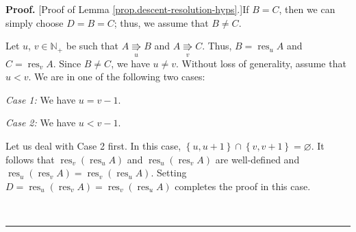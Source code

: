 \documentclass[12pt]{article}
\theoremstyle{plain}
\theoremstyle{definition}
\newenvironment{proof}[1][Proof]{\noindent\textbf{#1.} }{\ \rule{0.5em}{0.5em}}
\begin{document}
\begin{proof}
[Proof of Lemma \ref{prop.descent-resolution-hyps}.]If $B=C$, then we can
simply choose $D=B=C$; thus, we assume that $B\neq C$.

Let $u$, $v \in\mathbb{N}_{+}$ be such that $A\underset{u}{\Rrightarrow}B$ and $A\underset{v}{\Rrightarrow}C$.
Thus, $B = \operatorname{res}_u A$ and $C = \operatorname{res}_v A$.
Since $B \neq C$, we have $u \neq v$.
Without loss of generality, assume that $u<v$. We are in one of the following two cases:

\textit{Case 1:} We have $u=v-1$.

\textit{Case 2:} We have $u<v-1$.

Let us deal with Case 2 first. In this
case, $\left\{  u,u+1\right\}  \cap\left\{  v,v+1\right\}
=\varnothing$.
It follows that
$\operatorname*{res}\nolimits_{v}\left(  \operatorname*{res}\nolimits_{u}%
A\right)  $ and $\operatorname*{res}\nolimits_{u}%
\left(  \operatorname*{res}\nolimits_{v}A\right)  $ are well-defined and $\operatorname*{res}\nolimits_{u}\left(
\operatorname*{res}\nolimits_{v}A\right)  =\operatorname*{res}\nolimits_{v}%
\left(  \operatorname*{res}\nolimits_{u}A\right) $. Setting
$D=\operatorname*{res}\nolimits_{u}\left(  \operatorname*{res}\nolimits_{v}%
A\right)  =\operatorname*{res}\nolimits_{v}\left(  \operatorname*{res}%
\nolimits_{u}A\right)  $ completes the proof in this case.


\end{proof}
\end{document}
